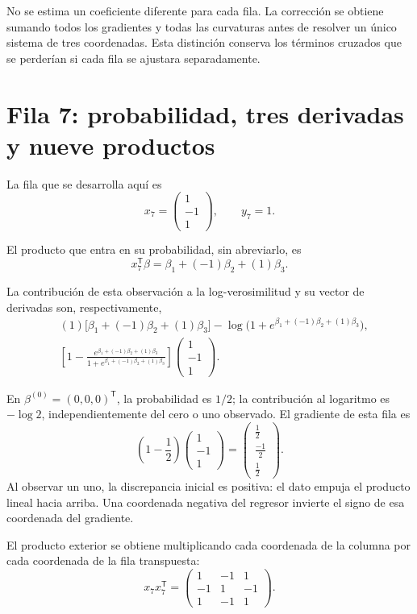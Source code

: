 \documentclass[11pt,a4paper]{article}
\newcommand{\T}{^{\mathsf T}}
\begin{document}
No se estima un coeficiente diferente para cada fila.
La corrección se obtiene sumando todos los gradientes y todas
las curvaturas antes de resolver un único sistema de tres coordenadas.
Esta distinción conserva los términos cruzados que se perderían
si cada fila se ajustara separadamente.

\clearpage
\section{Fila 7: probabilidad, tres derivadas y nueve productos}\label{logit89}
La fila que se desarrolla aquí es
\[
x_{7}=\begin{pmatrix}1\\-1\\1\end{pmatrix},\qquad y_{7}=1.
\]

El producto que entra en su probabilidad, sin abreviarlo, es
\[
x_{7}\T\beta=\beta_1+(-1)\beta_2+(1)\beta_3.
\]

La contribución de esta observación a la log-verosimilitud
y su vector de derivadas son, respectivamente,
\[
\begin{aligned}
&(1)\bigl[\beta_1+(-1)\beta_2+(1)\beta_3\bigr]-\log\bigl(1+e^{\beta_1+(-1)\beta_2+(1)\beta_3}\bigr),\\&\left[1-\frac{e^{\beta_1+(-1)\beta_2+(1)\beta_3}}{1+e^{\beta_1+(-1)\beta_2+(1)\beta_3}}\right]\begin{pmatrix}1\\-1\\1\end{pmatrix}.\end{aligned}
\]

En \(\beta^{(0)}=(0,0,0)\T\), la probabilidad es \(1/2\);
la contribución al logaritmo es \(-\log2\), independientemente
del cero o uno observado. El gradiente de esta fila es
\[
\left(1-\frac12\right)\begin{pmatrix}1\\-1\\1\end{pmatrix}=\begin{pmatrix}\frac{1}{2}\\\frac{-1}{2}\\\frac{1}{2}\end{pmatrix}.
\]
Al observar un uno, la discrepancia inicial es positiva: el dato empuja el producto lineal hacia arriba. Una coordenada negativa del regresor invierte el signo de esa coordenada del gradiente.

El producto exterior se obtiene multiplicando cada coordenada
de la columna por cada coordenada de la fila transpuesta:
\[
x_{7}x_{7}\T=\begin{pmatrix}1&-1&1\\-1&1&-1\\1&-1&1\end{pmatrix}.
\]
\end{document}
